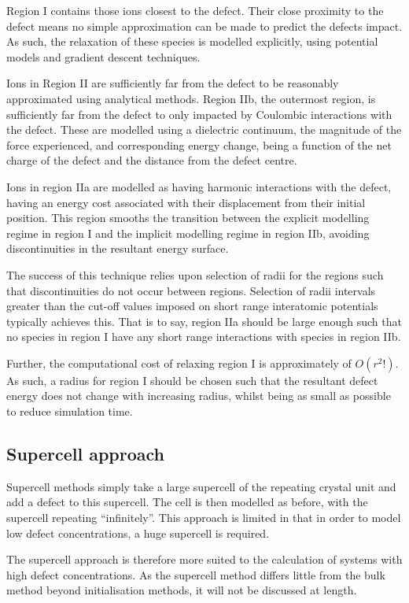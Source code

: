 Region I contains those ions closest to the defect.
Their close proximity to the defect means no simple approximation can be made to predict the defects impact.
As such, the relaxation of these species is modelled explicitly, using potential models and gradient descent techniques.

Ions in Region II are sufficiently far from the defect to be reasonably approximated using analytical methods.
Region IIb, the outermost region, is sufficiently far from the defect to only impacted by Coulombic interactions with the defect.
These are modelled using a dielectric continuum, the magnitude of the force experienced, and corresponding energy change, being a function of the net charge of the defect and the distance from the defect centre.


Ions in region IIa are modelled as having harmonic interactions with the defect, having an energy cost associated with their displacement from their initial position.
This region smooths the transition between the explicit modelling regime in region I and the implicit modelling regime in region IIb, avoiding discontinuities in the resultant energy surface.

The success of this technique relies upon selection of radii for the regions such that discontinuities do not occur between regions.
Selection of radii intervals greater than the cut-off values imposed on short range interatomic potentials typically achieves this.
That is to say, region IIa should be large enough such that no species in region I have any short range interactions with species in region IIb.

Further, the computational cost of relaxing region I is approximately of {\color{red}$O(r^2!)$}.
As such, a radius for region I should be chosen such that the resultant defect energy does not change with increasing radius, whilst being as small as possible to reduce simulation time.

\subsection{Supercell approach} %
Supercell methods simply take a large supercell of the repeating crystal unit and add a defect to this supercell.
The cell is then modelled as before, with the supercell repeating ``infinitely''.
This approach is limited in that in order to model low defect concentrations, a huge supercell is required.

The supercell approach is therefore more suited to the calculation of systems with high defect concentrations.
As the supercell method differs little from the bulk method beyond initialisation methods, it will not be discussed at length.


